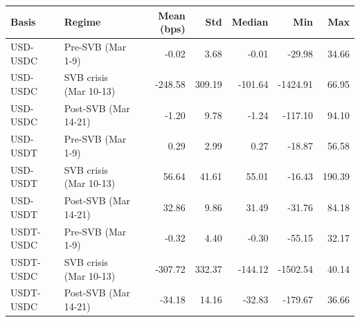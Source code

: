 \begin{tabular}{llrrrrr}
\toprule
Basis & Regime & Mean (bps) & Std & Median & Min & Max \\
\midrule
USD-USDC & Pre-SVB (Mar 1-9) & -0.02 & 3.68 & -0.01 & -29.98 & 34.66 \\
USD-USDC & SVB crisis (Mar 10-13) & -248.58 & 309.19 & -101.64 & -1424.91 & 66.95 \\
USD-USDC & Post-SVB (Mar 14-21) & -1.20 & 9.78 & -1.24 & -117.10 & 94.10 \\
USD-USDT & Pre-SVB (Mar 1-9) & 0.29 & 2.99 & 0.27 & -18.87 & 56.58 \\
USD-USDT & SVB crisis (Mar 10-13) & 56.64 & 41.61 & 55.01 & -16.43 & 190.39 \\
USD-USDT & Post-SVB (Mar 14-21) & 32.86 & 9.86 & 31.49 & -31.76 & 84.18 \\
USDT-USDC & Pre-SVB (Mar 1-9) & -0.32 & 4.40 & -0.30 & -55.15 & 32.17 \\
USDT-USDC & SVB crisis (Mar 10-13) & -307.72 & 332.37 & -144.12 & -1502.54 & 40.14 \\
USDT-USDC & Post-SVB (Mar 14-21) & -34.18 & 14.16 & -32.83 & -179.67 & 36.66 \\
\bottomrule
\end{tabular}